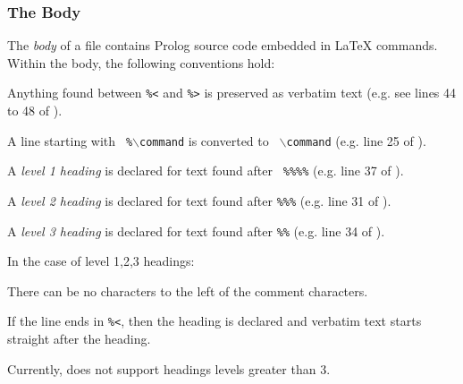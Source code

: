 \subsubsection{The Body}

The {\em body} of a {\PROD} file contains Prolog source code
embedded in {\LaTeX} commands. Within the body, the
following conventions
hold:

\bi  \item Anything found between {\tt \%<} and {\tt \%>} is
preserved as verbatim text (e.g. see lines 44 to 48 of
).  \item A line starting with {\tt
\%{$\backslash$}command} is converted to {\tt
{$\backslash$}command} (e.g. line 25 of ). \item
A {\em level 1 heading} is declared for text found after {\tt
\%\%\%\%} (e.g. line 37 of ).
 \item A {\em level 2 heading} is declared for text
found after {\tt \%\%\%} (e.g. line 31 of ).
 \item A {\em level 3 heading} is declared for text
found after {\tt \%\%} (e.g. line 34 of ).
 \ei

In the case of level 1,2,3  headings:
\bi \item There can be no characters to the left of the comment
characters. \item If the line ends in {\tt \%<}, then the heading
is declared and verbatim text starts straight after the heading.
\ei

Currently, {\PROD} does not support headings levels greater than
3.
\clearpage
